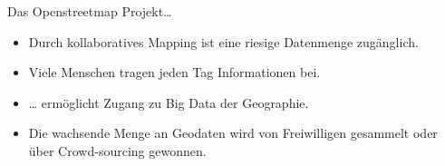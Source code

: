 \documentclass[ignorenonframetext,]{beamer}
\providecommand{\tightlist}{%
  \setlength{\itemsep}{0pt}\setlength{\parskip}{0pt}}
\begin{document}
\begin{frame}{Das Openstreetmap Projekt\ldots{}}

\begin{itemize}
\tightlist
\item
  Durch kollaboratives Mapping ist eine riesige Datenmenge zugänglich.
\item
  Viele Menschen tragen jeden Tag Informationen bei.
\item
  \ldots{} ermöglicht Zugang zu Big Data der Geographie.
\item
  Die wachsende Menge an Geodaten wird von Freiwilligen gesammelt oder
  über Crowd-sourcing gewonnen.
\end{itemize}

\end{frame}
\end{document}
